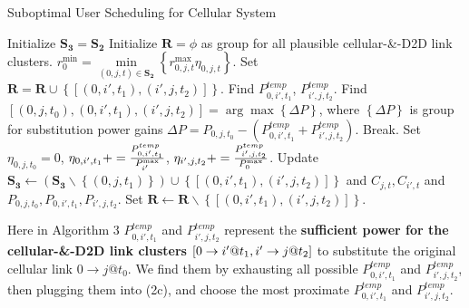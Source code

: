 \documentclass{ieeeaccess}
\begin{document}
\begin{algorithm}[!h]
\caption{Suboptimal User Scheduling for Cellular System}
\label{alg:1}
\begin{algorithmic}[1]
\STATE Initialize ${{\mathbf{S}}_{\mathbf{3}}}={{\mathbf{S}}_{\mathbf{2}}}$
  \STATE Initialize ${\mathbf{R}} = \phi $ as group for all plausible cellular-\&-D2D link clusters.
  \STATE $r_0^{\min } = \mathop {\min }\limits_{\left( {0,j,t} \right) \in {{\mathbf{S}}_{\mathbf{2}}}} \left\{ {r_{0,j,t}^{\max }{\eta _{0,j,t}}} \right\}$.
            \STATE Set ${\mathbf{R = R}} \cup \left\{ {\left[ {\left( {0,i',{t_1}} \right),\left( {i',j,{t_2}} \right)} \right]} \right\}$.
          \ENDIF
        \ENDFOR
      \ENDIF
    \ENDFOR
  \ENDFOR
    \STATE Find ${P_{0,i',{t_1}}^{temp}}$, ${P_{i',j,{t_2}}^{temp}}$. 
    \STATE Find $\left[ {\left( {0,j,{t_0}} \right),\left( {0,i',{t_1}} \right),\left( {i',j,{t_2}} \right)} \right] = \arg \max \left\{ {\Delta P} \right\}$, where ${\left\{ {\Delta P} \right\}}$ is group for substitution power gains $\Delta P = {P_{0,j,{t_0}}} - \left( {{P_{0,i',{t_1}}^{temp}} + {P_{i',j,{t_2}}^{temp}}} \right)$. 
      \STATE Break.
    \ENDIF
    \STATE Set ${\eta _{0,j,{t_0}} = 0}$, ${\eta _{0,i',{t_1}}} += \frac{{{P_{0,i',{t_1}}^{{\rm{temp}}}}}}{{P_{i'}^{\max }}}$, ${\eta _{i',j,{t_2}}} += \frac{{{P_{i',j,{t_2}}^{{\rm{temp}}}}}}{{P_{0}^{\max }}}$.
    \STATE Update ${{\mathbf{S}}_{\mathbf{3}}} \leftarrow \left( {{{\mathbf{S}}_{\mathbf{3}}}\backslash \left\{ {\left( {0,j,{t_1}} \right)} \right\}} \right) \cup \left\{ {\left[ {\left( {0,i',{t_1}} \right),\left( {i',j,{t_2}} \right)} \right]} \right\}$ and ${C_{j,t}},{C_{i',t}}$ and ${P_{0,j,{t_0}}},{P_{0,i',{t_1}}},{P_{i',j,{t_2}}}$.
    \STATE Set $\mathbf{R} \leftarrow \mathbf{R}\backslash \left\{ {\left[ {\left( {0,i',{t_1}} \right),\left( {i',j,{t_2}} \right)} \right]} \right\}$.
  \ENDWHILE
\ENDFOR
\end{algorithmic}
\end{algorithm}
Here in Algorithm 3 ${P_{0,i',{t_1}}^{temp}}$ and ${P_{i',j,{t_2}}^{temp}}$ represent the \textbf{sufficient power for the  cellular-\&-D2D link clusters} $\left[ {{\rm{0}} \to i'@{t_1},i' \to j@{t_2}} \right]$ to substitute the original cellular link $0 \to j @{t_0}$. We find them by exhausting all possible ${P_{0,i',{t_1}}^{temp}}$ and ${P_{i',j,{t_2}}^{temp}}$, then plugging them into (2c), and  choose the most proximate ${P_{0,i',{t_1}}^{temp}}$ and ${P_{i',j,{t_2}}^{temp}}$.
\end{document}
